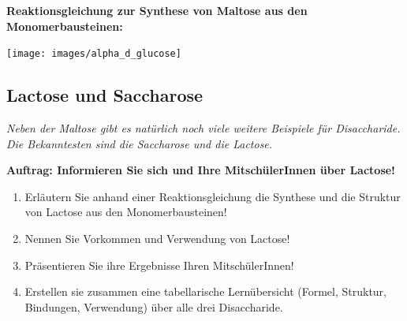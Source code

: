 \documentclass{scrartcl}  %
\begin{document}
\vspace{0.3cm}
			\noindent \textbf{Reaktionsgleichung zur Synthese von Maltose aus den Monomerbausteinen:} \newline

			\begin{minipage}{0.7\textwidth}
				\texttt{[image: images/alpha\_d\_glucose]}
			\end{minipage}
			\begin{minipage}{0.2\textwidth}
				\ch{->}
			\end{minipage}
			
		\subsection{Lactose und Saccharose}
		
			\textit{Neben der Maltose gibt es natürlich noch viele weitere Beispiele für Disaccharide. Die Bekanntesten sind die Saccharose und die Lactose.} \newline
			
			\noindent \textbf{Auftrag: Informieren Sie sich und Ihre MitschülerInnen über Lactose!}
			\begin{enumerate}
				    \item Erläutern Sie anhand einer Reaktionsgleichung die Synthese und die Struktur von Lactose aus den Monomerbausteinen!
				    \item  Nennen Sie Vorkommen und Verwendung von Lactose!
				    \item  Präsentieren Sie ihre Ergebnisse Ihren MitschülerInnen!
				    \item  Erstellen sie zusammen eine tabellarische Lernübersicht (Formel, Struktur, Bindungen, Verwendung) über alle drei Disaccharide. 
			\end{enumerate}
\end{document}
